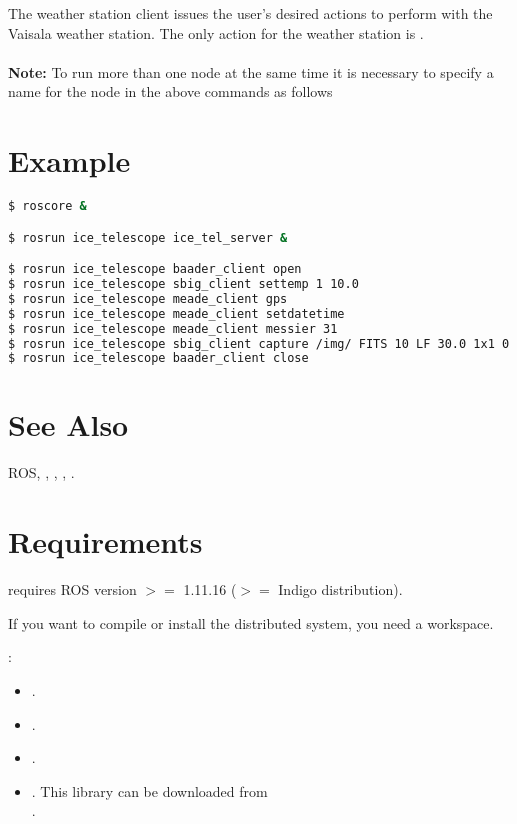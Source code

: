 \documentclass[a4paper,english]{article}
\begin{document}
The weather station client issues the user's desired actions to perform with the Vaisala weather station. The only action for the weather station is . \\

    \\

\textbf{Note:} To run more than one  node at the same time it is necessary to specify a name for the node in the above commands as follows 


\section{Example}

\begin{lstlisting}[language=bash, frame=single, breaklines=true]
$ roscore &

$ rosrun ice_telescope ice_tel_server &

$ rosrun ice_telescope baader_client open
$ rosrun ice_telescope sbig_client settemp 1 10.0
$ rosrun ice_telescope meade_client gps
$ rosrun ice_telescope meade_client setdatetime
$ rosrun ice_telescope meade_client messier 31
$ rosrun ice_telescope sbig_client capture /img/ FITS 10 LF 30.0 1x1 0 0 0 0 1 1
$ rosrun ice_telescope baader_client close
\end{lstlisting}


\section{See Also}

ROS, , , , .


\section{Requirements}

\begin{description}\setlength{\itemsep}{0cm}
\item[ROS Environment]  requires ROS version $>=$ 1.11.16 ($>=$ Indigo distribution).
\item[ROS Workspace] If you want to compile or install the distributed system, you need a  workspace.
\item[Libraries]: 
	\begin{itemize}
		\item {}.
		\item {}.
		\item {}.
		\item {}. This library can be downloaded from \\ .
	\end{itemize}
\end{description}
\end{document}
